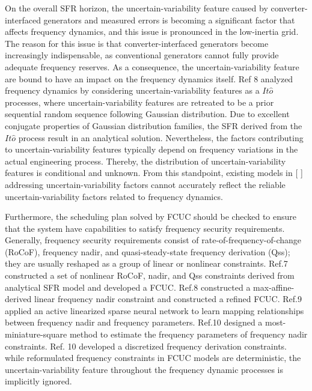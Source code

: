 \documentclass[lettersize,journal]{IEEEtran}
\begin{document}
On the overall SFR horizon, the uncertain-variability feature caused by converter-interfaced generators and measured errors is becoming a significant factor that affects frequency dynamics, and this
issue is pronounced in the low-inertia grid. The reason for this issue is that converter-interfaced generators become increasingly indispensable, as conventional generators cannot fully provide
adequate frequency reserves. As a consequence, the uncertain-variability feature are bound to have an impact on the frequency dynamics itself.  Ref 8 analyzed frequency dynamics by considering
uncertain-variability features as a \(It\widehat{o}\) processes, where uncertain-variability features are retreated to be a prior sequential random sequence following Gaussian distribution. Due to
excellent conjugate properties of Gaussian distribution families, the SFR derived from the \(It\widehat{o}\) process result in an analytical solution.  Nevertheless, the factors contributing to
uncertain-variability features typically depend on frequency variations in the actual engineering process. Thereby, the distribution of uncertain-variability features is conditional and unknown. From
this standpoint, existing models in [ ] addressing uncertain-variability factors cannot accurately reflect the reliable uncertain-variability factors related to frequency dynamics.


Furthermore, the scheduling plan solved by FCUC should be checked to ensure that the system have capabilities to satisfy frequency security requirements. Generally, frequency security requirements
consist of rate-of-frequency-of-change (RoCoF), frequency nadir, and quasi-steady-state frequency derivation (Qss); they are usually reshaped as a group of linear or nonlinear constraints.  Ref.7
constructed a set of nonlinear RoCoF, nadir, and Qss constraints derived from analytical SFR model and developed a FCUC.  Ref.8 constructed a max-affine-derived linear frequency nadir constraint and
constructed a refined FCUC.  Ref.9 applied an active linearized sparse neural network to learn mapping relationships between frequency nadir and frequency parameters.  Ref.10 designed a
most-miniature-square method to estimate the frequency parameters of frequency nadir constraints.  Ref. 10 developed a discretized frequency derivation constraints.  while reformulated frequency
constraints in FCUC models are deterministic, the uncertain-variability feature throughout the frequency dynamic processes is implicitly ignored.
\end{document}
